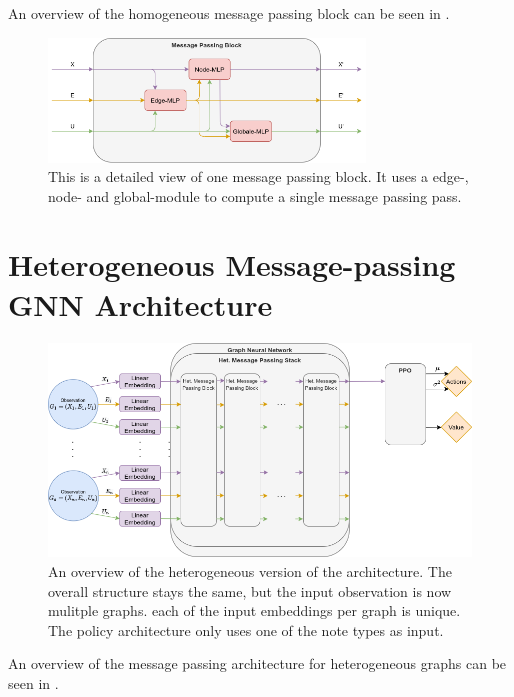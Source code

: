 An overview of the homogeneous message passing block can be seen in .

\begin{figure}[htp]
    \centering
    \includegraphics[width=0.75\textwidth]{figures/message_passing_block.png}
    \hspace{1cm}   
    \caption{This is a detailed view of one message passing block. It uses a edge-, node- and global-module to compute a single message passing pass.}
    \label{fig:message_passing_block}
\end{figure}


\section{Heterogeneous Message-passing GNN Architecture}
\begin{figure}[htp]
    \centering
    \includegraphics[width=1.0\textwidth]{figures/heterogeneous_gnn.png}
    \hspace{1cm}   
    \caption{An overview of the heterogeneous version of the architecture. The overall structure stays the same, but the input observation is now mulitple graphs. each of the input embeddings per graph is unique. The policy architecture only uses one of the note types as input.}
    \label{fig:heterogeneous_gnn}
\end{figure}

An overview of the message passing architecture for heterogeneous graphs can be seen in .


